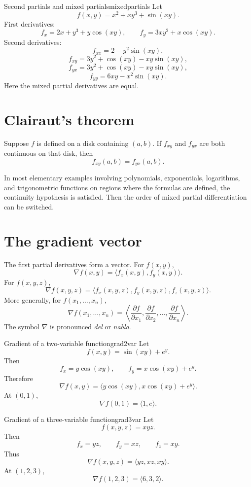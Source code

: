 \documentclass[11pt]{article}
\newcommand{\grad}{\nabla}
\begin{document}
\begin{examplebox}{Second partials and mixed partials}{mixedpartials}
Let
\[
f(x,y)=x^2+xy^3+\sin(xy).
\]
First derivatives:
\[
f_x=2x+y^3+y\cos(xy),
\qquad
f_y=3xy^2+x\cos(xy).
\]
Second derivatives:
\[
f_{xx}=2-y^2\sin(xy),
\]
\[
f_{xy}=3y^2+\cos(xy)-xy\sin(xy),
\]
\[
f_{yx}=3y^2+\cos(xy)-xy\sin(xy),
\]
\[
f_{yy}=6xy-x^2\sin(xy).
\]
Here the mixed partial derivatives are equal.
\end{examplebox}

\section{Clairaut's theorem}

\begin{importantbox}
Suppose $f$ is defined on a disk containing $(a,b)$. If $f_{xy}$ and $f_{yx}$ are both continuous on that disk, then
\[
f_{xy}(a,b)=f_{yx}(a,b).
\]
\end{importantbox}

In most elementary examples involving polynomials, exponentials, logarithms, and trigonometric functions on regions where the formulas are defined, the continuity hypothesis is satisfied. Then the order of mixed partial differentiation can be switched.

\section{The gradient vector}

The first partial derivatives form a vector. For $f(x,y)$,
\[
\grad f(x,y)=\langle f_x(x,y),f_y(x,y)\rangle.
\]
For $f(x,y,z)$,
\[
\grad f(x,y,z)=\langle f_x(x,y,z),f_y(x,y,z),f_z(x,y,z)\rangle.
\]
More generally, for $f(x_1,\ldots,x_n)$,
\[
\grad f(x_1,\ldots,x_n)=\left\langle
\frac{\partial f}{\partial x_1},
\frac{\partial f}{\partial x_2},
\ldots,
\frac{\partial f}{\partial x_n}
\right\rangle.
\]
The symbol $\nabla$ is pronounced \emph{del} or \emph{nabla}.

\begin{examplebox}{Gradient of a two-variable function}{grad2var}
Let
\[
f(x,y)=\sin(xy)+e^y.
\]
Then
\[
f_x=y\cos(xy),
\qquad
f_y=x\cos(xy)+e^y.
\]
Therefore
\[
\grad f(x,y)=\langle y\cos(xy),x\cos(xy)+e^y\rangle.
\]
At $(0,1)$,
\[
\grad f(0,1)=\langle 1,e\rangle.
\]
\end{examplebox}

\begin{examplebox}{Gradient of a three-variable function}{grad3var}
Let
\[
f(x,y,z)=xyz.
\]
Then
\[
f_x=yz,\qquad f_y=xz,\qquad f_z=xy.
\]
Thus
\[
\grad f(x,y,z)=\langle yz,xz,xy\rangle.
\]
At $(1,2,3)$,
\[
\grad f(1,2,3)=\langle 6,3,2\rangle.
\]
\end{examplebox}
\end{document}
